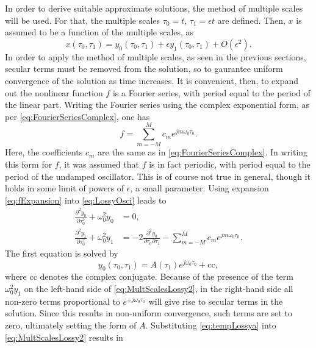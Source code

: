 \documentclass[11pt,twoside,a4paper,english]{book}
\begin{document}
In order to derive suitable approximate solutions, the method of multiple scales will be used. For that, the multiple scales $\tau_0=t$, $\tau_1 = \epsilon t$ are defined. Then, $x$ is assumed to be a function of the multiple scales, as
\begin{equation}
x(\tau_0,\tau_1) = y_0(\tau_0,\tau_1) + \epsilon y_1(\tau_0,\tau_1) + O(\epsilon^2).
\end{equation}
In order to apply the method of multiple scales, as seen in the previous sections, secular terms must be removed from the solution, so to gaurantee uniform convergence of the solution as time increases. It is convenient, then, to expand out the nonlinear function $f$ is a Fourier series, with period equal to the period of the linear part. Writing the Fourier series using the complex exponential form, as per \eqref{eq:FourierSeriesComplex}, one has
\begin{equation}\label{eq:fExpansion}
f = \sum_{m=-M}^M c_m e^{jm\omega_0 \tau_0}. 
\end{equation}
Here, the coefficients $c_m$ are the same as in \eqref{eq:FourierSeriesComplex}.  In writing this form for $f$, it was assumed that $f$ is in fact periodic, with period equal to the period of the undamped oscillator. This is of course not true in general, though it holds in some limit of powers of $\epsilon$, a small parameter. Using expansion \eqref{eq:fExpansion} into \eqref{eq:LossyOsci} leads to  
\begin{subequations}
    \begin{align}
          \frac{\partial^2 y_0}{\partial \tau_0^2} + \omega_0^2 y_0 &= 0, \label{eq:MultScalesLossy1}\\
          \frac{\partial^2 y_1}{\partial\tau_0^2} + \omega_0^2 y_1 &=  - 2\frac{\partial^2 y_0}{\partial \tau_0 \partial \tau_1} - \sum_{m=-M}^M c_m e^{jm\omega_0 \tau_0}. \label{eq:MultScalesLossy2}
    \end{align}
\end{subequations}
The first equation is solved by
\begin{equation}\label{eq:tempLossya}
y_0(\tau_0,\tau_1) = A(\tau_1) e^{j\omega_0 \tau_0} + \text{cc},
\end{equation} 
where $\text{cc}$ denotes the complex conjugate. Because of the presence of the term $\omega_0^2 y_1$ on the left-hand side of \eqref{eq:MultScalesLossy2}, in the right-hand side all non-zero terms proportional to $e^{\pm j\omega_0\tau_0}$ will give rise to secular terms in the solution. Since this results in non-uniform convergence, such terms are set to zero, ultimately setting the form of $A$. Substituting  \eqref{eq:tempLossya} into \eqref{eq:MultScalesLossy2} results in
\end{document}
